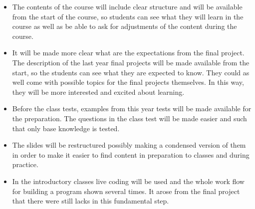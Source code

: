 \documentclass[11pt]{article}
\begin{document}
\begin{itemize}
 \item The contents of the course will include clear structure and will
   be available from the start of the course, so students can see what
   they will learn in the course as well as be able to ask for
   adjustments of the content during the course.

\item It will be made more clear what are the expectations from the
  final project. The description of the last year final projects will
  be made available from the start, so the students can see what they
  are expected to know. They could as well come with possible topics
  for the final projects themselves. In this way, they will be more
  interested and excited about learning.


 \item Before the class tests, examples from this year tests will be
   made available for the preparation. The questions in the class test
   will be made easier and such that only base knowledge is tested.



%

 \item The slides will be restructured possibly making a condensed
   version of them in order to make it easier to find content in
   preparation to classes and during practice.
%
%   
%
%
%

   
%

 \item In the introductory classes live coding will be used and the
   whole work flow for building a program shown several times. It arose
   from the final project that there were still lacks in this
   fundamental step.
   

\end{itemize}
\end{document}

